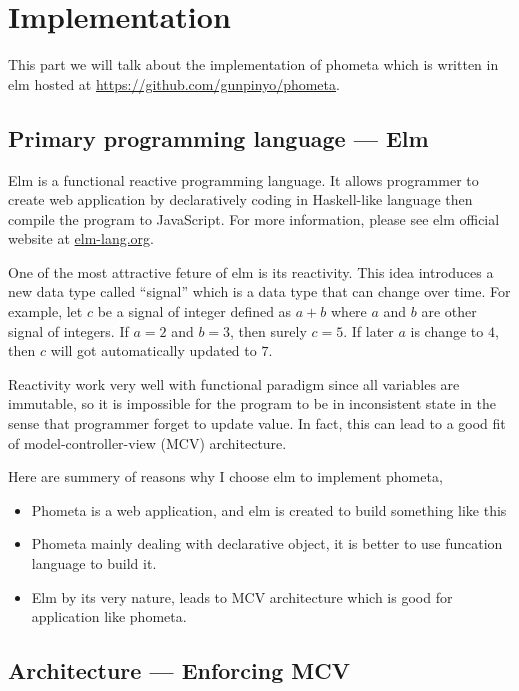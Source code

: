 \documentclass[master.tex]{subfiles}
\begin{document}
\chapter{Implementation}

This part we will talk about the implementation of phometa which is written in elm
hosted at \url{https://github.com/gunpinyo/phometa}.

\section{Primary programming language --- Elm}
Elm\supercite{elm-official-website} is a functional reactive programming
language. It allows programmer to create web application by declaratively
coding in Haskell-like language then compile the program to JavaScript. For more
information, please see elm official website at \url{elm-lang.org}.

One of the most attractive feture of elm is its reactivity. This idea introduces
a new data type called ``signal'' which is a data type that can change over
time. For example, let $c$ be a signal of integer defined as $a + b$ where $a$
and $b$ are other signal of  integers. If $a = 2$ and $b = 3$, then surely
$c = 5$. If later $a$ is change to $4$, then $c$ will got automatically updated
to $7$.

Reactivity work very well with functional paradigm since all variables are
immutable, so it is impossible for the program to be in inconsistent state in
the sense that programmer forget to update value. In fact, this can lead to a
good fit of model-controller-view (MCV) architecture.

Here are summery of reasons why I choose elm to implement phometa,
\begin{itemize}
  \item Phometa is a web application, and elm is created to build something like
    this
  \item Phometa mainly dealing with declarative object, it is better to use
    funcation  language to build it.
  \item Elm by its very nature, leads to MCV architecture which is good for
    application like phometa.
\end{itemize}

\section{Architecture --- Enforcing MCV}







\end{document}
